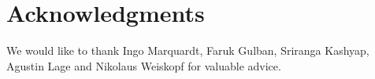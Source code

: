 \clearpage
\section{Acknowledgments}
We would like to thank Ingo Marquardt, Faruk Gulban, Sriranga Kashyap, Agustin Lage and Nikolaus Weiskopf for valuable advice.

\stopsupplement
\clearpage
\printbibliography[heading=subbibnumbered, title={References}]